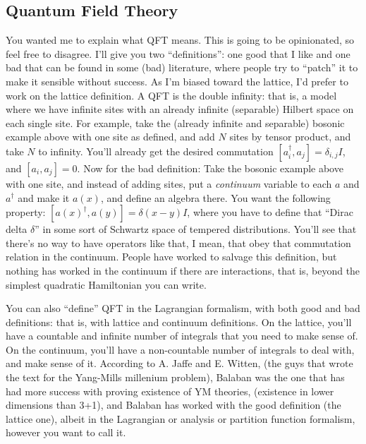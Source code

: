  	 \subsection{Quantum Field Theory}
 	 You wanted me to explain what QFT means. This is going to be opinionated, so feel free to disagree.
 	 I'll give you two ``definitions'': one good that I like and one bad that can be found in some (bad) literature,
 	 where people try to ``patch'' it to make it sensible without success. As I'm biased toward the lattice, I'd prefer to work on the lattice definition.
 	 A QFT is the double infinity: that is, a model where we have infinite sites with an already infinite (separable) Hilbert space on each single site.
 	 For example, take the (already infinite and separable) bosonic example above with one site as defined, and add $N$ sites by tensor product, and take $N$ to infinity. You'll already get the desired commutation $[a_i^\dagger,a_j]=\delta_{i,j}I$, and $[a_i, a_j]=0$.
 	 Now for the bad definition: Take the bosonic example above with one site, and instead of adding sites, put a \emph{continuum} variable to each
 	 $a$ and $a^\dagger$ and make it $a(x)$, and define an algebra there. You want the following property: $[a(x)^\dagger, a(y)]=\delta(x-y)I$, where you
 	 have to define that ``Dirac delta $\delta$'' in some sort of Schwartz space of tempered distributions. You'll see that there's no way
 	 to have operators like that, I mean, that obey that commutation relation in the continuum. People have worked to salvage this definition, but nothing has worked in the continuum
 	 if there are interactions, that is, beyond the simplest quadratic Hamiltonian you can write.
 
 	 You can also ``define'' QFT in the Lagrangian formalism, with both good and bad definitions: that is, with lattice and continuum definitions.
 	 On the lattice, you'll have a countable and infinite number of integrals that you need to make sense of.
 	 On the continuum, you'll have a non-countable number of integrals to deal with, and make sense of it.
 	 According to A. Jaffe and E. Witten, (the guys that wrote the text for the Yang-Mills millenium problem), Balaban was the one that has had
 	 more success with proving existence of YM theories, (existence in lower dimensions than 3+1), and Balaban has worked with the good definition
 	 (the lattice one), albeit in the Lagrangian or analysis or partition function formalism, however you want to call it.
 

